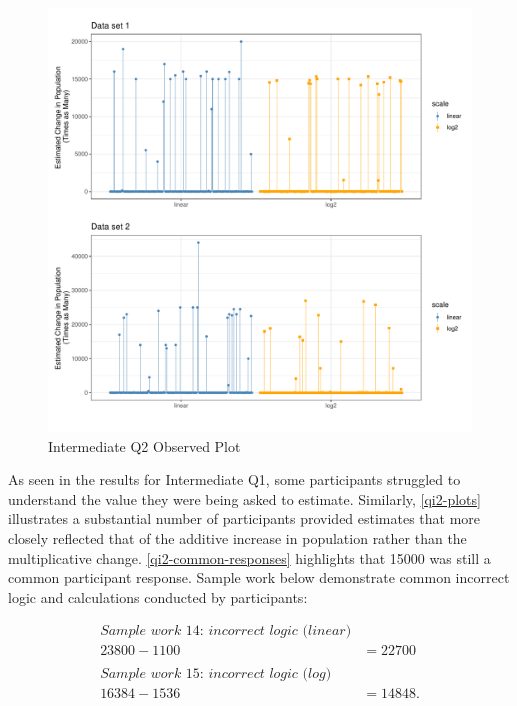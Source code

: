 \documentclass[print]{nuthesis}
\begin{document}
\begin{figure}[tbp]

{\centering \includegraphics[width=1\linewidth,]{thesis_files/figure-latex/qi2-plots-1} 

}

\caption{Intermediate Q2 Observed Plot}\label{fig:qi2-plots}
\end{figure}

As seen in the results for Intermediate Q1, some participants struggled to understand the value they were being asked to estimate.
Similarly, \cref{qi2-plots} illustrates a substantial number of participants provided estimates that more closely reflected that of the additive increase in population rather than the multiplicative change.
\cref{qi2-common-responses} highlights that 15000 was still a common participant response.
Sample work below demonstrate common incorrect logic and calculations conducted by participants:

\begin{align}
\textit{Sample work 14: incorrect logic (linear)} \nonumber\\
23800-1100&=22700 \nonumber\\   
\nonumber \\
\textit{Sample work 15: incorrect logic (log)} \nonumber\\
16384-1536&=14848. \nonumber
\end{align}
\end{document}
